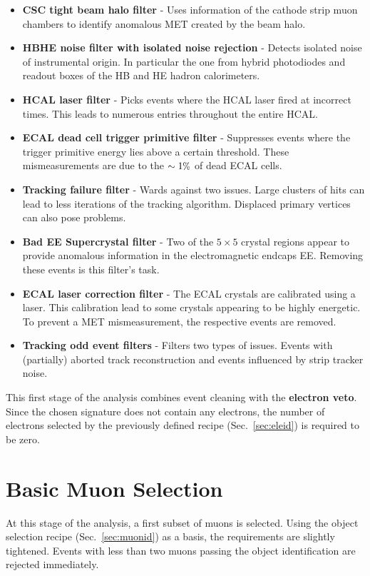 \begin{itemize}
\item \textbf{CSC tight beam halo filter} - Uses information of the cathode strip muon chambers to identify anomalous MET created by the beam halo.
\item \textbf{HBHE noise filter with isolated noise rejection} - Detects isolated noise of instrumental origin. In particular the one from hybrid photodiodes and readout boxes of the HB and HE hadron calorimeters.
\item \textbf{HCAL laser filter} - Picks events where the HCAL laser fired at incorrect times. This leads to numerous entries throughout the entire HCAL.
\item \textbf{ECAL dead cell trigger primitive filter} - Suppresses events where the trigger primitive energy lies above a certain threshold. These mismeasurements are due to the $\sim 1\pct$ of dead ECAL cells.
\item \textbf{Tracking failure filter} - Wards against two issues. Large clusters of hits can lead to less iterations of the tracking algorithm. Displaced primary vertices can also pose problems.
\item \textbf{Bad EE Supercrystal filter} - Two of the $5 \times 5$ crystal regions appear to provide anomalous information in the electromagnetic endcaps EE. Removing these events is this filter's task.
\item \textbf{ECAL laser correction filter} - The ECAL crystals are calibrated using a laser. This calibration lead to some crystals appearing to be highly energetic. To prevent a MET mismeasurement, the respective events are removed. 
\item \textbf{Tracking odd event filters} - Filters two types of issues. Events with (partially) aborted track reconstruction and events influenced by strip tracker noise.
\end{itemize}

This first stage of the analysis combines event cleaning with the \textbf{electron veto}. Since the chosen signature does not contain any electrons, the number of electrons selected by the previously defined recipe (Sec.~\ref{sec:eleid}) is required to be zero.

\section{Basic Muon Selection}
\label{sec:basicmuon}

At this stage of the analysis, a first subset of muons is selected. Using the object selection recipe (Sec.~\ref{sec:muonid}) as a basis, the requirements are slightly tightened. Events with less than two muons passing the object identification are rejected immediately.

